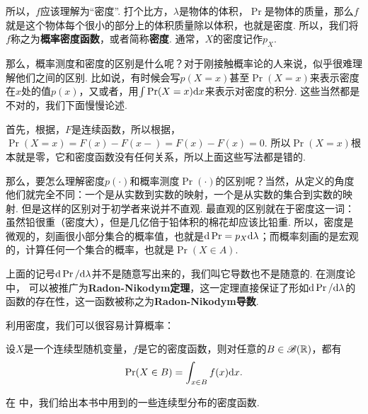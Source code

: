所以，$f$应该理解为“密度”. 打个比方，$\lambda$是物体的体积，$\Pr$是物体的质量，那么$f$就是这个物体每个很小的部分上的体积质量除以体积，也就是密度. 所以，我们将$f$称之为\textbf{概率密度函数}，或者简称\textbf{密度}. 通常，$X$的密度记作$p_X$. 

那么，概率测度和密度的区别是什么呢？对于刚接触概率论的人来说，似乎很难理解他们之间的区别. 比如说，有时候会写$p(X=x)$甚至$\Pr(X=x)$来表示密度在$x$处的值$p(x)$，又或者，用$\int\Pr(X=x)\mathrm{d} x$来表示对密度的积分. 这些当然都是不对的，我们下面慢慢论述. 

首先，根据，$F$是连续函数，所以根据，$\Pr(X=x)=F(x)-F(x-)=F(x)-F(x)=0$. 所以$\Pr(X=x)$根本就是零，它和密度函数没有任何关系，所以上面这些写法都是错的. 

那么，要怎么理解密度$p(\cdot)$和概率测度$\Pr(\cdot)$的区别呢？当然，从定义的角度他们就完全不同：一个是从实数到实数的映射，一个是从实数的集合到实数的映射. 但是这样的区别对于初学者来说并不直观. 最直观的区别就在于密度这一词：虽然铅很重（密度大），但是几亿倍于铅体积的棉花却应该比铅重. 所以，密度是微观的，刻画很小部分集合的概率值，也就是$\mathrm{d}\Pr=p_X\mathrm{d} \lambda$；而概率刻画的是宏观的，计算任何一个集合的概率，也就是$\Pr(X\in A)$.

\begin{remark}
    上面的记号$\mathrm{d}\Pr/\mathrm{d}\lambda$并不是随意写出来的，我们叫它导数也不是随意的. 在测度论中， 可以被推广为\textbf{Radon-Nikodym定理}，这一定理直接保证了形如$\mathrm{d}\Pr/\mathrm{d}\lambda$的函数的存在性，这一函数被称之为\textbf{Radon-Nikodym导数}. 
\end{remark}

利用密度，我们可以很容易计算概率：
\begin{proposition}\label{prop:continuous-prob}
设$X$是一个连续型随机变量，$f$是它的密度函数，则对任意的$B\in\mathscr{B}(\mathbb{R})$，都有
\[\Pr(X\in B)=\int_{x\in B}f(x)\mathrm{d} x.\]
\end{proposition}

在 中，我们给出本书中用到的一些连续型分布的密度函数. 

